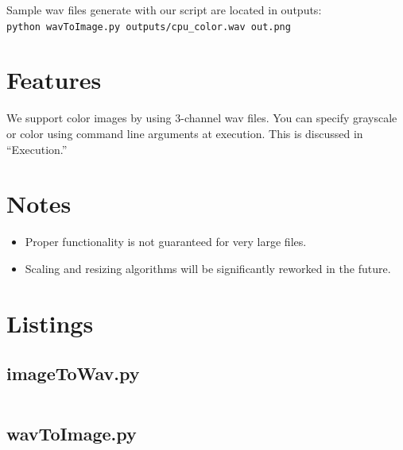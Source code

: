 \documentclass[12pt,letterpaper]{article}
\begin{document}
\noindent
Sample wav files generate with our script are located in outputs: \\
\verb!python wavToImage.py outputs/cpu_color.wav out.png!


\section{Features}

We support color images by using 3-channel wav files. You can specify grayscale or color using command line arguments at execution. This is discussed in ``Execution.''


\section{Notes}

\begin{itemize}
\item Proper functionality is not guaranteed for very large files.
\item Scaling and resizing algorithms will be significantly reworked in the future.
\end{itemize}
\newpage


\section{Listings}
\subsection{imageToWav.py}
\inputminted[baselinestretch=1,fontsize=\footnotesize,linenos=true,fontfamily=courier]{python}{../imageToWav.py}
\newpage
\subsection{wavToImage.py}
\inputminted[baselinestretch=1,fontsize=\footnotesize,linenos=true,fontfamily=courier]{python}{../wavToImage.py}
\end{document}
